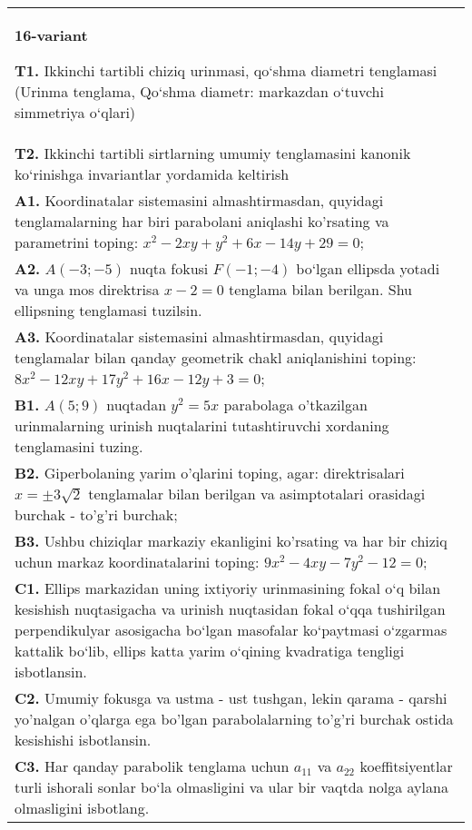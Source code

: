 \documentclass{article}
\begin{document}
\begin{tabular}{m{17cm}}
\textbf{16-variant}
\newline

\textbf{T1.} Ikkinchi tartibli chiziq urinmasi, qo‘shma diametri tenglamasi (Urinma tenglama, Qo‘shma diametr: markazdan o‘tuvchi simmetriya o‘qlari) \\
\textbf{T2.} Ikkinchi tartibli sirtlarning umumiy tenglamasini kanonik ko‘rinishga invariantlar yordamida keltirish \\
\textbf{A1.} Koordinatalar sistemasini almashtirmasdan, quyidagi tenglamalarning har biri parabolani aniqlashi ko'rsating va parametrini toping: $x^2-2 x y+y^2+6 x-14 y+29=0$; \\
\textbf{A2.} $A (-3;-5)$ nuqta fokusi $F (-1;-4)$ bo‘lgan ellipsda yotadi va unga mos direktrisa $x-2=0$ tenglama bilan berilgan. Shu ellipsning tenglamasi tuzilsin. \\
\textbf{A3.} Koordinatalar sistemasini almashtirmasdan, quyidagi tenglamalar bilan qanday geometrik chakl aniqlanishini toping: $8 x^2-12 x y+17 y^2+16 x-12 y+3=0$; \\
\textbf{B1.} $A(5;9)$ nuqtadan $y^2=5x$ parabolaga o'tkazilgan urinmalarning urinish nuqtalarini tutashtiruvchi xordaning tenglamasini tuzing. \\
\textbf{B2.} Giperbolaning yarim o'qlarini toping, agar: direktrisalari $x= \pm 3 \sqrt{2}$ tenglamalar bilan berilgan va asimptotalari orasidagi burchak - to'g'ri burchak; \\
\textbf{B3.} Ushbu chiziqlar markaziy ekanligini ko'rsating va har bir chiziq uchun markaz koordinatalarini toping: $9 x^2-4 x y-7 y^2-12=0$; \\
\textbf{C1.} Ellips markazidan uning ixtiyoriy urinmasining fokal o‘q bilan kesishish nuqtasigacha va urinish nuqtasidan fokal o‘qqa tushirilgan perpendikulyar asosigacha bo‘lgan masofalar ko‘paytmasi o‘zgarmas kattalik bo‘lib, ellips katta yarim o‘qining kvadratiga tengligi isbotlansin. \\
\textbf{C2.} Umumiy fokusga va ustma - ust tushgan, lekin qarama - qarshi yo'nalgan o'qlarga ega bo'lgan parabolalarning to'g'ri burchak ostida kesishishi isbotlansin. \\
\textbf{C3.} Har qanday parabolik tenglama uchun $a_{11}$ va $a_{22}$ koeffitsiyentlar turli ishorali sonlar bo‘la olmasligini va ular bir vaqtda nolga aylana olmasligini isbotlang. \\

\end{tabular}
\vspace{1cm}
\end{document}

